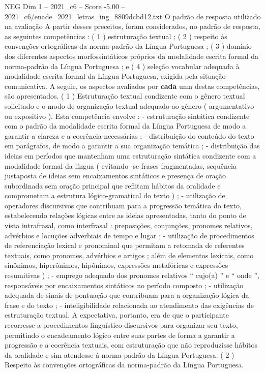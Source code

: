 \begin{textsample}{NEG Dim 1 – 2021\_c6 – Score -5.00 – 2021\_c6/enade\_2021\_letras\_ing\_8809dcbd12.txt}
O padrão de resposta utilizado na avaliação A partir desses preceitos, foram considerados, no padrão de resposta, as seguintes competências : ( 1 ) estruturação textual ; ( 2 ) respeito às convenções ortográficas da norma-padrão da Língua Portuguesa ; ( 3 ) domínio dos diferentes aspectos morfossintáticos próprios da modalidade escrita formal da norma-padrão da Língua Portuguesa ; e ( 4 ) seleção vocabular adequada à modalidade escrita formal da Língua Portuguesa, exigida pela situação comunicativa.
A seguir, os aspectos avaliados por \textbf{cada} uma destas competências, são apresentados. ( 1 ) Estruturação textual condizente com o gênero textual solicitado e o modo de organização textual adequado ao gênero ( argumentativo ou expositivo ).
Esta competência envolve : - estruturação sintática condizente com o padrão da modalidade escrita formal da Língua Portuguesa de modo a garantir a clareza e a coerência necessárias ; - distribuição do conteúdo do texto em parágrafos, de modo a garantir a sua organização temática ; - distribuição das ideias em períodos que mantenham uma estruturação sintática condizente com a modalidade formal da língua ( evitando -se frases fragmentadas, sequência justaposta de ideias sem encaixamentos sintáticos e presença de oração subordinada sem oração principal que reflitam hábitos da oralidade e comprometam a estrutura lógico-gramatical do texto ) ; - utilização de operadores discursivos que contribuam para a progressão temática do texto, estabelecendo relações lógicas entre as ideias apresentadas, tanto do ponto de vista intrafrasal, como interfrasal : preposições, conjunções, pronomes relativos, advérbios e locuções adverbiais de tempo e lugar ; - utilização de procedimentos de referenciação lexical e pronominal que permitam a retomada de referentes textuais, como pronomes, advérbios e artigos ; além de elementos lexicais, como sinônimos, hiperônimos, hipônimos, expressões metafóricas e expressões resumitivas ) ; - emprego adequado dos pronomes relativos “ cujo(a) ” e “ onde ”, responsáveis por encaixamentos sintáticos no período composto ; - utilização adequada de sinais de pontuação que contribuam para a organização lógica da frase e do texto ; - inteligibilidade relacionada ao atendimento das exigências de estruturação textual.
A expectativa, portanto, era de que o participante recorresse a procedimentos linguístico-discursivos para organizar seu texto, permitindo o encadeamento lógico entre suas partes de forma a garantir a progressão e a coerência textuais, com estruturação que não reproduzisse hábitos da oralidade e sim atendesse à norma-padrão da Língua Portuguesa. ( 2 ) Respeito às convenções ortográficas da norma-padrão da Língua Portuguesa.

\end{textsample}
